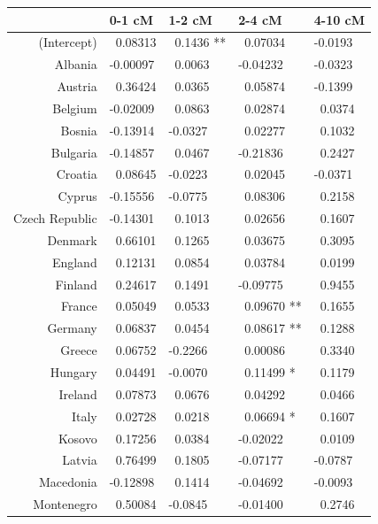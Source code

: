 \documentclass{article}
\begin{document}
\begin{table}[!htp]
\begin{center}
\begin{tabular}{|r|llll|}
  \hline
 & 0-1 cM & 1-2 cM & 2-4 cM & 4-10 cM \\ 
  \hline
(Intercept) & ~0.08313    & ~0.1436 ** & ~0.07034    & -0.0193    \\ 
  Albania & -0.00097    & ~0.0063    & -0.04232    & -0.0323    \\ 
  Austria & ~0.36424    & ~0.0365    & ~0.05874    & -0.1399    \\ 
  Belgium & -0.02009    & ~0.0863    & ~0.02874    & ~0.0374    \\ 
  Bosnia & -0.13914    & -0.0327    & ~0.02277    & ~0.1032    \\ 
  Bulgaria & -0.14857    & ~0.0467    & -0.21836    & ~0.2427    \\ 
  Croatia & ~0.08645    & -0.0223    & ~0.02045    & -0.0371    \\ 
  Cyprus & -0.15556    & -0.0775    & ~0.08306    & ~0.2158    \\ 
  Czech Republic & -0.14301    & ~0.1013    & ~0.02656    & ~0.1607    \\ 
  Denmark & ~0.66101    & ~0.1265    & ~0.03675    & ~0.3095    \\ 
  England & ~0.12131    & ~0.0854    & ~0.03784    & ~0.0199    \\ 
  Finland & ~0.24617    & ~0.1491    & -0.09775    & ~0.9455    \\ 
  France & ~0.05049    & ~0.0533    & ~0.09670 ** & ~0.1655    \\ 
  Germany & ~0.06837    & ~0.0454    & ~0.08617 ** & ~0.1288    \\ 
  Greece & ~0.06752    & -0.2266    & ~0.00086    & ~0.3340    \\ 
  Hungary & ~0.04491    & -0.0070    & ~0.11499 *  & ~0.1179    \\ 
  Ireland & ~0.07873    & ~0.0676    & ~0.04292    & ~0.0466    \\ 
  Italy & ~0.02728    & ~0.0218    & ~0.06694 *  & ~0.1607    \\ 
  Kosovo & ~0.17256    & ~0.0384    & -0.02022    & ~0.0109    \\ 
  Latvia & ~0.76499    & ~0.1805    & -0.07177    & -0.0787    \\ 
  Macedonia & -0.12898    & ~0.1414    & -0.04692    & -0.0093    \\ 
  Montenegro & ~0.50084    & -0.0845    & -0.01400    & ~0.2746    \\ 

\end{tabular}
\end{center}
\end{table}
\end{document}
